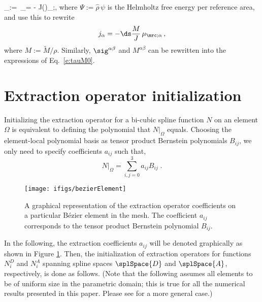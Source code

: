 \documentclass[11pt]{article}
\newcommand{\rem}[1]{\textcolor{green}{#1 [Needed?]}}
\begin{document}
\mu_\mrc := \hat\rho\,\tilde\mu_\mrc = \ds\pa{\Psi}{\phi} - J\ds\bigg(\pa{\Psi}{\phi_{;\alpha}}\bigg)_{\!\!;\alpha},
\eqe
where $\Psi:=\hat\rho\,\psi$ is the Helmholtz free energy per reference area, and use this to rewrite
\begin{equation} \label{e:jphi2}
j_\alpha = - \ds\frac{M}{J} \, \mu_{\mrc;\alpha}\,,
\end{equation}
where $M := \tilde M/\rho$. %
Similarly, $\sig^{\alpha\beta}$ and $M^{\alpha\beta}$ can be rewritten into the expressions of Eq.~\eqref{e:tauM0}.



\section{Extraction operator initialization} \label{App:ExtractionInitialization}
Initializing the extraction operator for a bi-cubic spline function $N$ on an element $\Omega$ is equivalent to defining the polynomial that $N|_\Omega$ equals. Choosing the element-local polynomial basis as tensor product Bernstein polynomials $B_{ij}$, we only need to specify coefficients $a_{ij}$ such that,
\begin{equation}
	N|_\Omega = \sum_{i,j=0}^{3} a_{ij} B_{ij}\;.
\end{equation}
\begin{figure}[H]
	\centering
	\texttt{[image: ifigs/bezierElement]}
	\caption{A graphical representation of the extraction operator coefficients on a particular B\'ezier element in the mesh. The coefficient $a_{ij}$ corresponds to the tensor product Bernstein polynomial $B_{ij}$.}
	\label{fig:bezierElement}
\end{figure}
In the following, the extraction coefficients $a_{ij}$ will be denoted graphically as shown in Figure \ref{fig:bezierElement}. Then, the initialization of extraction operators for functions $N_i^D$ and $N_i^A$ spanning spline spaces $\splSpace{D}$ and $\splSpace{A}$, respectively, is done as follows. (Note that the following assumes all elements to be of uniform size in the parametric domain; this is true for all the numerical results presented in this paper. Please see \citep{toshniwal2017smooth} for a more general case.)
\end{document}
